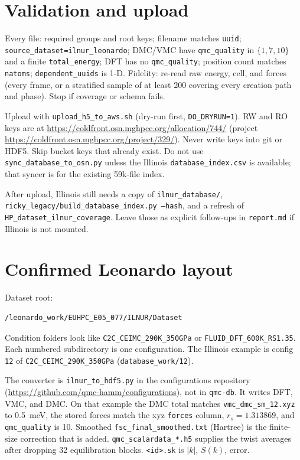 \documentclass[11pt]{article}
\begin{document}
\section{Validation and upload}
Every file: required groups and root keys; filename matches \texttt{uuid};
\texttt{source\_dataset=ilnur\_leonardo}; DMC/VMC have \texttt{qmc\_quality}
in $\{1,7,10\}$ and a finite \texttt{total\_energy}; DFT has no
\texttt{qmc\_quality}; position count matches \texttt{natoms};
\texttt{dependent\_uuids} is 1-D.
Fidelity: re-read raw energy, cell, and forces (every frame, or a stratified
sample of at least 200 covering every creation path and phase).
Stop if coverage or schema fails.

Upload with \texttt{upload\_h5\_to\_aws.sh} (dry-run first, \texttt{DO\_DRYRUN=1}).
RW and RO keys are at
\url{https://coldfront.osn.mghpcc.org/allocation/744/}
(project \url{https://coldfront.osn.mghpcc.org/project/329/}).
Never write keys into git or HDF5. Skip bucket keys that already exist.
Do not use \texttt{sync\_database\_to\_osn.py} unless the Illinois
\texttt{database\_index.csv} is available; that syncer is for the existing
59k-file index.

After upload, Illinois still needs a copy of \texttt{ilnur\_database/},
\texttt{ricky\_legacy/build\_database\_index.py --hash}, and a refresh of
\texttt{HP\_dataset\_ilnur\_coverage}. Leave those as explicit follow-ups
in \texttt{report.md} if Illinois is not mounted.

\section{Confirmed Leonardo layout}
Dataset root:
\begin{verbatim}
/leonardo_work/EUHPC_E05_077/ILNUR/Dataset
\end{verbatim}
Condition folders look like \texttt{C2C\_CEIMC\_290K\_350GPa} or
\texttt{FLUID\_DFT\_600K\_RS1.35}. Each numbered subdirectory is one
configuration. The Illinois example is config \texttt{12} of
\texttt{C2C\_CEIMC\_290K\_350GPa} (\texttt{database\_work/12}).

The converter is \texttt{ilnur\_to\_hdf5.py} in the configurations repository
(\url{https://github.com/qmc-hamm/configurations}), not in \texttt{qmc-db}.
It writes DFT, VMC, and DMC. On that example the DMC total matches
\texttt{vmc\_dmc\_sm\_12.xyz} to 0.5~meV, the stored forces match the xyz
\texttt{forces} column, $r_s=1.313869$, and \texttt{qmc\_quality} is 10.
Smoothed \texttt{fsc\_final\_smoothed.txt} (Hartree) is the finite-size
correction that is added. \texttt{qmc\_scalardata\_*.h5} supplies the twist
averages after dropping 32 equilibration blocks. \texttt{<id>.sk} is
$|k|$, $S(k)$, error.
\end{document}
